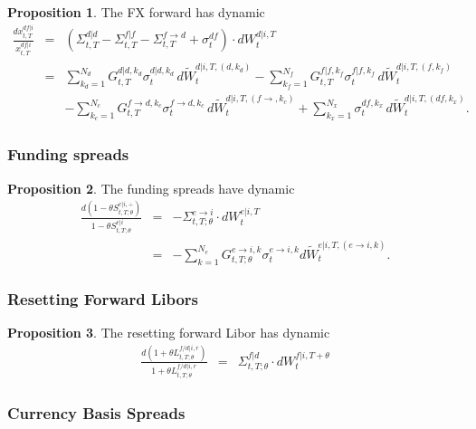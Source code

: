 \documentclass[11pt,english]{amsart}
\theoremstyle{definition}
\newtheorem{prop}{Proposition}
\begin{document}
\begin{prop}
The FX forward has dynamic 
\begin{eqnarray}
  \frac{d x^{df|i}_{t,T}}{x^{df|i}_{t,T}}  
  &=& \left( \Sigma^{d|d}_{t,T} - \Sigma^{f|f}_{t,T}  - \Sigma^{f\to d}_{t,T}  + \sigma^{df}_t \right)   \cdot dW^{d|i,T}_t   \\
  &=& \sum_{k_d=1}^{N_d}  G^{d|d,k_d}_{t,T} \sigma^{d|d,k_d}_{t} \, d\widetilde{W}^{d|i,T,(d,k_d)}_t 
  - \sum_{k_f=1}^{N_f}  G^{f|f,k_f}_{t,T} \sigma^{f|f,k_f}_{t}  \, d\widetilde{W}^{d|i,T,(f,k_f)}_t  \nonumber \\
  & & - \sum_{k_{c}=1}^{N_c}  G^{f\to d,k_c}_{t,T} \sigma^{f\to d,k_c}_{t} \, d\widetilde{W}^{d|i,T,(f\to ,k_c)}_t 
  + \sum_{k_x=1}^{N_x}  \sigma^{df,k_x}_{t}  \, d\widetilde{W}^{d|i,T,(df,k_x)}_t  . \nonumber
\end{eqnarray} 
\end{prop}


\subsubsection{Funding spreads}


\begin{prop}
The funding spreads have dynamic 
\begin{eqnarray}
  \frac{d (1-\theta S^{e|i,\div}_{t,T;\theta})}{1-\theta S^{e|i}_{t,T;\theta}}  
  &=& - \Sigma^{e\to i}_{t,T;\theta}  \cdot dW^{e|i,T}_t  \\
  &=& -  \sum_{k=1}^{N_e}  G^{e\to i,k}_{t,T;\theta} \sigma^{e\to i,k}_{t}   d\widetilde{W}^{e|i,T,(e\to i,k)}_t . \nonumber
\end{eqnarray} 
\end{prop}



\subsubsection{Resetting Forward Libors}



\begin{prop}
The resetting forward Libor has dynamic 
\begin{eqnarray}
  \frac{d (1+\theta L^{f/d|i,r}_{t,T;\theta})}{1+\theta L^{f/d|i,r}_{t,T;\theta}}  
  &=&  \Sigma^{f|d}_{t,T;\theta}  \cdot dW^{f|i,T+\theta}_t
\end{eqnarray} 
\end{prop}


\subsubsection{Currency Basis Spreads}
\end{document}

